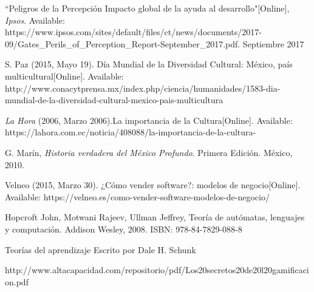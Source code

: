 \begin{thebibliography}{X}
	\textnormal{ ``Peligros de la Percepción Impacto global de la ayuda al desarrollo"[Online], \textit{Ipsos}. Available: https://www.ipsos.com/sites/default/files/ct/news/documents/2017-09/Gates\_Perils\_of\_Perception\_Report-September\_2017.pdf. Septiembre 2017 }	

	\textnormal{ S. Paz (2015, Mayo 19). Día Mundial de la Diversidad Cultural: México, país multicultural[Online]. Available: http://www.conacytprensa.mx/index.php/ciencia/humanidades/1583-dia-mundial-de-la-diversidad-cultural-mexico-pais-multicultura
	}

	\textnormal{ \textit{La Hora} (2006, Marzo 2006).La importancia de la Cultura[Online]. Available: https://lahora.com.ec/noticia/408088/la-importancia-de-la-cultura-
	}

	\textnormal{ G. Marín, \textit{Historia verdadera del México Profundo}. Primera Edición. México, 2010.
	}


	\textnormal Velneo (2015, Marzo 30). ¿Cómo vender software?: modelos de negocio[Online]. Available: https://velneo.es/como-vender-software-modelos-de-negocio/
	
	\textnormal	Hopcroft John, Motwani Rajeev, Ullman Jeffrey, Teoría de autómatas, lenguajes y computación. Addison Wesley, 2008. ISBN: 978-84-7829-088-8

\textnormal	Teorías del aprendizaje	Escrito por Dale H. Schunk

\textnormal	http://www.altacapacidad.com/repositorio/pdf/Los20secretos20de20l20gamificacion.pdf

\end{thebibliography}